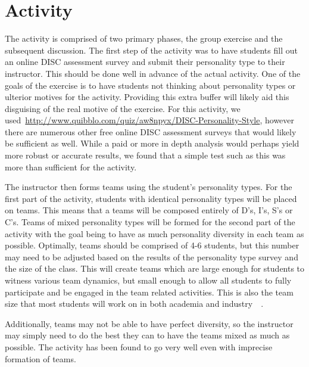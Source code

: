\documentclass[conference]{IEEEtran}
\begin{document}
{%



\section{Activity}
\label{sec: activity}

The activity is comprised of two primary phases, the group exercise and the subsequent discussion. The first step of the activity was to have students fill out an online DISC assessment survey and submit their personality type to their instructor. This should be done well in advance of the actual activity. One of the goals of the exercise is to have students not thinking about personality types or ulterior motives for the activity. Providing this extra buffer will likely aid this disguising of the real motive of the exercise. For this activity, we used~\url{http://www.quibblo.com/quiz/aw8npyx/DISC-Personality-Style}, however there are numerous other free online DISC assessment surveys that would likely be sufficient as well. While a paid or more in depth analysis would perhaps yield more robust or accurate results, we found that a simple test such as this was more than sufficient for the activity. 

The instructor then forms teams using the student's personality types. For the first part of the activity, students with identical personality types will be placed on teams. This means that a teams will be composed entirely of D's, I's, S's or C's. Teams of mixed personality types will be formed for the second part of the activity with the goal being to have as much personality diversity in each team as possible. Optimally, teams should be comprised of 4-6 students, but this number may need to be adjusted based on the results of the personality type survey and the size of the class. This will create teams which are large enough for students to witness various team dynamics, but small enough to allow all students to fully participate and be engaged in the team related activities. This is also the team size that most students will work on in both academia and industry~\cite{Guo:2009:GPS:1516546.1516579}~\cite{Petkovic:2006:TPS:1140124.1140202}.








Additionally, teams may not be able to have perfect diversity, so the instructor may simply need to do the best they can to have the teams mixed as much as possible. The activity has been found to go very well even with imprecise formation of teams.

}
\end{document}
